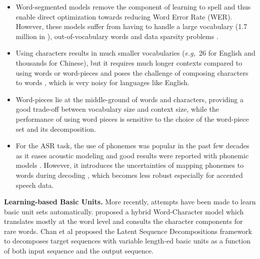 \documentclass{article}
\def\eg{{\it e.g,}}
\begin{document}
\begin{itemize}[leftmargin=10pt]
\vspace{-10pt}
\item Word-segmented models remove the component of learning to spell and thus enable direct optimization towards reducing Word Error Rate (WER). However, these models suffer from having to handle a large vocabulary (1.7 million in \cite{soltau2016neural}), out-of-vocabulary words \cite{soltau2016neural, cho2015using} and data sparsity problems \cite{soltau2016neural}.  
\item Using characters results in much smaller vocabularies (\eg ~26 for English and thousands for Chinese), but it requires much longer contexts compared to using words or word-pieces and poses the challenge of composing characters to words \cite{graves2006connectionist, chan2015listen}, which is very noisy for languages like English.
\vspace{-5pt}
\item Word-pieces lie at the middle-ground of words and characters, providing a good trade-off between vocabulary size and context size, while the performance of using word pieces is sensitive to the choice of the word-piece set and its decomposition. 
\vspace{-5pt}
\item For the ASR task, the use of phonemes was popular in the past few decades as it eases acoustic modeling \cite{lee1988large} and good results were reported with phonemic models \cite{xiong2016achieving, sercu2016dense}. However, it introduces the uncertainties of mapping phonemes to words during decoding \cite{doss2003phoneme}, which becomes less robust especially for accented speech data.
\vspace{-5pt}
\end{itemize}

\textbf{Learning-based Basic Units.}
More recently, attempts have been made to learn basic unit sets automatically. \cite{luong2016achieving} proposed a  hybrid Word-Character model which translates mostly at the word level and consults the character components for rare words. Chan et al \cite{chan2016lsd} proposed the Latent Sequence Decompositions framework to decomposes target sequences with variable length-ed basic units as a function of both input sequence and the output sequence. %
\end{document}
